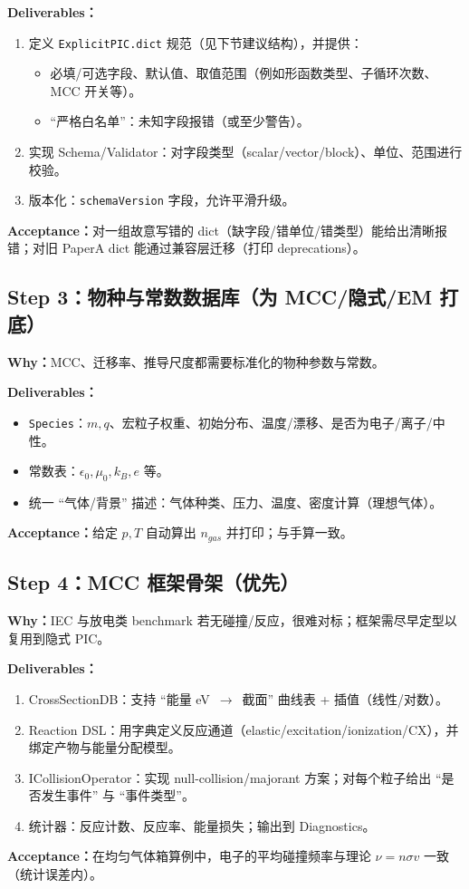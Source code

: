 \documentclass[11pt,a4paper]{ctexart}
\begin{document}
\textbf{Deliverables：}
\begin{enumerate}[leftmargin=2em]
\item 定义 \texttt{ExplicitPIC.dict} 规范（见下节建议结构），并提供：
  \begin{itemize}[leftmargin=2em]
  \item 必填/可选字段、默认值、取值范围（例如形函数类型、子循环次数、MCC 开关等）。
  \item ``严格白名单''：未知字段报错（或至少警告）。
  \end{itemize}
\item 实现 Schema/Validator：对字段类型（scalar/vector/block）、单位、范围进行校验。
\item 版本化：\texttt{schemaVersion} 字段，允许平滑升级。
\end{enumerate}
\textbf{Acceptance：}对一组故意写错的 dict（缺字段/错单位/错类型）能给出清晰报错；对旧 PaperA dict 能通过兼容层迁移（打印 deprecations）。

\subsection*{Step 3：物种与常数数据库（为 MCC/隐式/EM 打底）}
\textbf{Why：}MCC、迁移率、推导尺度都需要标准化的物种参数与常数。

\textbf{Deliverables：}
\begin{itemize}[leftmargin=2em]
\item \texttt{Species}：$m,q$、宏粒子权重、初始分布、温度/漂移、是否为电子/离子/中性。
\item 常数表：$\epsilon_0,\mu_0,k_B,e$ 等。
\item 统一 ``气体/背景'' 描述：气体种类、压力、温度、密度计算（理想气体）。
\end{itemize}
\textbf{Acceptance：}给定 $p,T$ 自动算出 $n_{gas}$ 并打印；与手算一致。

\subsection*{Step 4：MCC 框架骨架（优先）}
\textbf{Why：}IEC 与放电类 benchmark 若无碰撞/反应，很难对标；框架需尽早定型以复用到隐式 PIC。

\textbf{Deliverables：}
\begin{enumerate}[leftmargin=2em]
\item CrossSectionDB：支持 ``能量 eV \,$\rightarrow$\, 截面'' 曲线表 + 插值（线性/对数）。
\item Reaction DSL：用字典定义反应通道（elastic/excitation/ionization/CX），并绑定产物与能量分配模型。
\item ICollisionOperator：实现 null-collision/majorant 方案；对每个粒子给出 ``是否发生事件'' 与 ``事件类型''。
\item 统计器：反应计数、反应率、能量损失；输出到 Diagnostics。
\end{enumerate}
\textbf{Acceptance：}在均匀气体箱算例中，电子的平均碰撞频率与理论 $\nu=n\sigma v$ 一致（统计误差内）。
\end{document}
